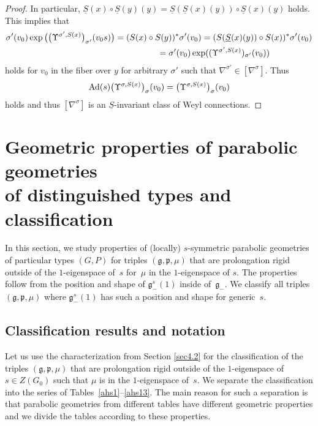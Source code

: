 \documentclass[pdftex]{sigma}
\newcommand{\si}{\sigma}
\newcommand{\un}{\underline}
\newcommand{\fg}{\mathfrak g}
\newcommand{\fp}{\mathfrak p}
\newcommand{\Ad}{{\rm Ad}}
\newcommand{\U}{\Upsilon}
\numberwithin{equation}{section}
\begin{document}
\begin{proof}
In particular, $\un S(x)\circ \un S(y)(y)=\un S(\un S(x)(y)) \circ \un S(x)(y)$ holds. This implies that
\begin{gather*}
\si'(v_0)\exp\big(\big(\U^{\si',S(x)}\big)_{\si'}(v_0s)\big) =(S(x)\circ S(y))^*\si'(v_0)=(S(\un S(x)(y))\circ S(x))^*\si'(v_0)\\
\hphantom{\si'(v_0)\exp\big(\big(\U^{\si',S(x)}\big)_{\si'}(v_0s)\big)}{} =\si'(v_0)\exp((\U^{\si',S(x)})_{\si'}(v_0))
\end{gather*}
holds for $v_0$ in the f\/iber over $y$ for arbitrary $\si'$ such that $\nabla^{\si'}\in [\nabla^\si]$. Thus
\begin{gather*}\Ad(s)\big(\U^{\si,S(x)}\big)_\si(v_0)=\big(\U^{\si,S(x)}\big)_\si(v_0)\end{gather*} holds and thus $[\nabla^\si]$ is an $\un S$-invariant class of Weyl connections.
\end{proof}

\section[Geometric properties of parabolic geometries of distinguished types and classif\/ication]{Geometric properties of parabolic geometries\\ of distinguished types and classif\/ication} \label{sec6}

In this section, we study properties of (locally) $s$-symmetric parabolic geometries of particular types $(G,P)$ for triples $(\fg,\fp,\mu)$ that are prolongation rigid outside of the $1$-eigenspace of~$s$ for~$\mu$ in the $1$-eigenspace of $s$. The properties follow from the position and shape of $\fg_-^s(1)$ inside of~$\fg_-$. We classify all triples $(\fg,\fp,\mu)$ where $\fg_-^s(1)$ has such a position and shape for generic~$s$.

\subsection{Classif\/ication results and notation}\label{sec61}

Let us use the characterization from Section \ref{sec4.2} for the classif\/ication of the triples $(\fg,\fp,\mu)$ that are prolongation rigid outside of the $1$-eigenspace of $s\in Z(G_0)$ such that $\mu$ is in the $1$-eigenspace of~$s$. We separate the classif\/ication into the series of Tables~\ref{ahs1}--\ref{ahs13}.
The main reason for such a separation is that parabolic geometries from dif\/ferent tables have dif\/ferent geometric properties and we divide the tables according to these properties.
\end{document}
